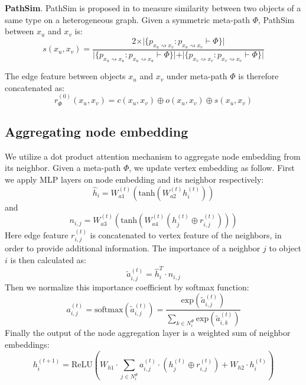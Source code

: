 \noindent{\small$\bullet$}\textbf{PathSim}. 
PathSim is proposed in \citep{SunHYYW11} to measure similarity between two objects of a same type on a heterogeneous graph. Given a symmetric meta-path $\Phi$, PathSim between $x_u$ and $x_v$ is:
\begin{equation*}
s(x_u,x_v) = \frac{2\times\vert\{ p_{x_u \rightsquigarrow x_v}:p_{x_u \rightsquigarrow x_v} \vdash \Phi \}\vert}{\vert\{ p_{x_u \rightsquigarrow x_u}:p_{x_u \rightsquigarrow x_u} \vdash \Phi \}\vert +\vert\{ p_{x_v \rightsquigarrow x_v}:p_{x_v \rightsquigarrow x_v} \vdash \Phi \}\vert }
\end{equation*}

The edge feature between objects $x_u$ and $x_v$ under meta-path $\Phi$ is therefore concatenated as:
\begin{equation}
\label{eq:edge}
r^{(0)}_\Phi(x_u,x_v) = c(x_u,x_v)\oplus o(x_u,x_v)\oplus s(x_u,x_v)
\end{equation}

\subsection{Aggregating node embedding}

We utilize a dot product attention mechanism to aggregate node embedding from its neighbor. Given a meta-path $\Phi$, we update vertex embedding as follow. First we apply MLP layers on node embedding and its neighbor respectively:
\begin{equation}
\hat{h}_i= W_{a1}^{(t)}(\text{tanh}(W_{a2}^{(t)}h^{(t)}_i ))
\end{equation}
and
\begin{equation}
n_{i,j} = W_{a3}^{(t)}(\text{tanh}(W_{a4}^{(t)}(h^{(t)}_j \oplus r^{(t)}_{i,j}) ))
\end{equation}
Here edge feature $r^{(t)}_{i,j}$ is concatenated to vertex feature of the neighbors, in order to provide additional information. The importance of a neighbor $j$ to object $i$ is then calculated as:
\begin{equation}
\label{eq:dot}
\tilde{a}^{(t)}_{i,j} = \hat{h}_i^T \cdot n_{i,j}
\end{equation}
Then we normalize this importance coefficient by softmax function:
\begin{equation}
\label{eq:softmax}
a^{(t)}_{i,j} = \text{softmax}(\tilde{a}^{(t)}_{i,j}) = \dfrac{\text{exp}(\tilde{a}^{(t)}_{i,j})}{\sum_{k\in N^\Phi_i}\text{exp}(\tilde{a}^{(t)}_{i,k})}
\end{equation}
Finally the output of the node aggregation layer is a weighted sum of neighbor embeddings: 
\begin{equation}
\label{eq:upd_node}
h^{(t+1)}_i = \text{ReLU}( W_{h1}\cdot \sum_{j\in N^\Phi_i} a^{(t)}_{i,j} \cdot ( h^{(t)}_j \oplus r^{(t)}_{i,j} ) + W_{h2}\cdot h^{(t)}_i ) 
\end{equation} 

